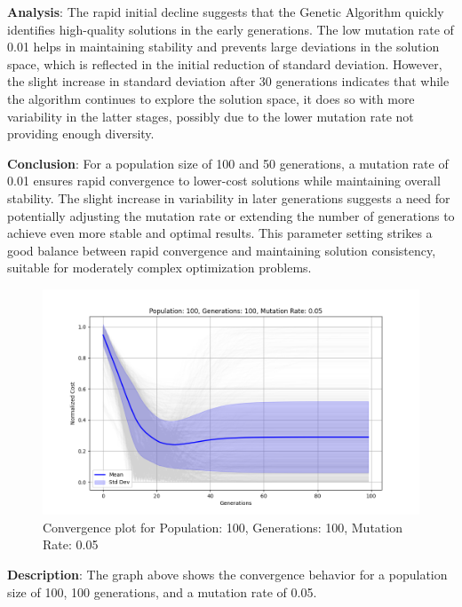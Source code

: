 \documentclass[
]{article}
\begin{document}
    \textbf{Analysis}: The rapid initial decline suggests that the Genetic Algorithm quickly identifies high-quality solutions in the early generations. The low mutation rate of 0.01 helps in maintaining stability and prevents large deviations in the solution space, which is reflected in the initial reduction of standard deviation. However, the slight increase in standard deviation after 30 generations indicates that while the algorithm continues to explore the solution space, it does so with more variability in the latter stages, possibly due to the lower mutation rate not providing enough diversity.

    \textbf{Conclusion}: For a population size of 100 and 50 generations, a mutation rate of 0.01 ensures rapid convergence to lower-cost solutions while maintaining overall stability. The slight increase in variability in later generations suggests a need for potentially adjusting the mutation rate or extending the number of generations to achieve even more stable and optimal results. This parameter setting strikes a good balance between rapid convergence and maintaining solution consistency, suitable for moderately complex optimization problems.

    \begin{figure}[H]
        \centering
        \includegraphics[width=\textwidth]{genetic_algorithm/Population_100_Generations_100_MutationRate_0.05}
        \caption{Convergence plot for Population: 100, Generations: 100, Mutation Rate: 0.05}
        \label{fig:ga_100_100_05}
    \end{figure}

    \textbf{Description}: The graph above shows the convergence behavior for a population size of 100, 100 generations, and a mutation rate of 0.05.
\end{document}
